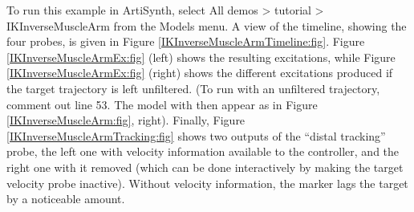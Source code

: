 To run this example in ArtiSynth, select {\sf All demos > tutorial >
IKInverseMuscleArm} from the {\sf Models} menu. A view of the timeline, showing
the four probes, is given in Figure \ref{IKInverseMuscleArmTimeline:fig}.
Figure \ref{IKInverseMuscleArmEx:fig} (left) shows the resulting excitations,
while Figure \ref{IKInverseMuscleArmEx:fig} (right) shows the different
excitations produced if the target trajectory is left unfiltered. (To run with
an unfiltered trajectory, comment out line 53. The model with then appear as in
Figure \ref{IKInverseMuscleArm:fig}, right). Finally, Figure
\ref{IKInverseMuscleArmTracking:fig} shows two outputs of the ``distal
tracking'' probe, the left one with velocity information available to the
controller, and the right one with it removed (which can be done interactively
by making the target velocity probe inactive).  Without velocity information,
the marker lags the target by a noticeable amount.

